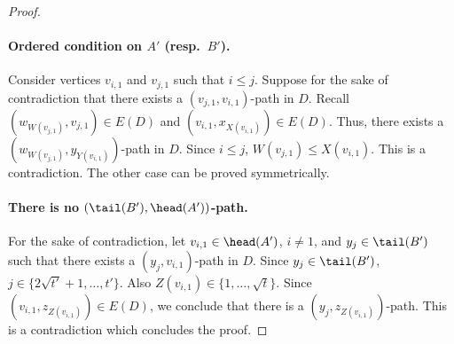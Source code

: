 \begin{proof}
\paragraph*{Ordered condition on $A'$ (resp.~$B'$).}
Consider vertices $v_{i,1}$ and $v_{j,1}$ such that $i \leq j$. Suppose for the sake of contradiction that there exists a $(v_{j,1},v_{i,1})$-path in $D$. Recall $(w_{W(v_{j,1})}, v_{j,1}) \in E(D)$ and $(v_{i,1},x_{X(v_{i,1})}) \in E(D)$. Thus, there exists a $(w_{W(v_{j,1})}, y_{Y(v_{i,1})})$-path in $D$. Since $i \leq j$, $W(v_{j,1}) \leq X(v_{i,1})$. This is a contradiction. The other case can be proved symmetrically.

\paragraph*{There is no $(\tail(B'),\head(A'))$-path.} For the sake of contradiction, let $v_{i,1} \in \head(A')$, $i\neq 1$, and $y_j \in \tail(B')$ such that there exists a $(y_j, v_{i,1})$-path in $D$. Since $y_j \in \tail(B')$, $j \in \{2\sqrt{t'} +1, \ldots, t'\}$. Also $Z(v_{i,1}) \in \{1, \ldots, \sqrt{t}\}$. Since $(v_{i,1}, z_{Z(v_{i,1})}) \in E(D)$, we conclude that there is a $(y_j, z_{Z(v_{i,1})})$-path. This is a contradiction which concludes the proof.
\end{proof}